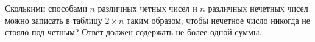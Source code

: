 \documentclass{article}
\begin{document}
Сколькими способами $n$ различных четных чисел и $n$ различных нечетных чисел можно записать в таблицу $2 \times n$ таким образом, чтобы нечетное число никогда не стояло под четным? Ответ должен содержать не более одной суммы.
\end{document}
